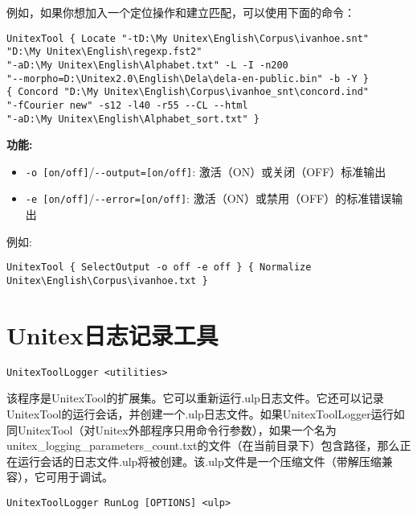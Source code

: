 \bigskip
\noindent 例如，如果你想加入一个定位操作和建立匹配，可以使用下面的命令：

\bigskip
\begin{verbatim}
UnitexTool { Locate "-tD:\My Unitex\English\Corpus\ivanhoe.snt" 
"D:\My Unitex\English\regexp.fst2"
"-aD:\My Unitex\English\Alphabet.txt" -L -I -n200 
"--morpho=D:\Unitex2.0\English\Dela\dela-en-public.bin" -b -Y }
{ Concord "D:\My Unitex\English\Corpus\ivanhoe_snt\concord.ind" 
"-fCourier new" -s12 -l40 -r55 --CL --html 
"-aD:\My Unitex\English\Alphabet_sort.txt" }
\end{verbatim}
 
\bigskip
\noindent \textbf{功能:}
\begin{itemize}
\item \verb+-o [on/off]+/\verb+--output=[on/off]+: 激活（ON）或关闭（OFF）标准输出
\item \verb+-e [on/off]+/\verb+--error=[on/off]+: 激活（ON）或禁用（OFF）的标准错误输出
\end{itemize} 
 
\noindent 例如:
\begin{verbatim}
UnitexTool { SelectOutput -o off -e off } { Normalize
Unitex\English\Corpus\ivanhoe.txt }
\end{verbatim}






\section{Unitex日志记录工具}
\label{section-UnitexToolLogger}
\verb+UnitexToolLogger <utilities>+

\bigskip
\noindent 该程序是UnitexTool的扩展集。它可以重新运行.ulp日志文件。它还可以记录UnitexTool的运行会话，并创建一个.ulp日志文件。如果UnitexToolLogger运行如同UnitexTool（对Unitex外部程序只用命令行参数），如果一个名为unitex\_logging\_parameters\_count.txt的文件（在当前目录下）包含路径，那么正在运行会话的日志文件.ulp将被创建。该.ulp文件是一个压缩文件（带解压缩兼容），它可用于调试。

\bigskip
\verb+UnitexToolLogger RunLog [OPTIONS] <ulp>+

